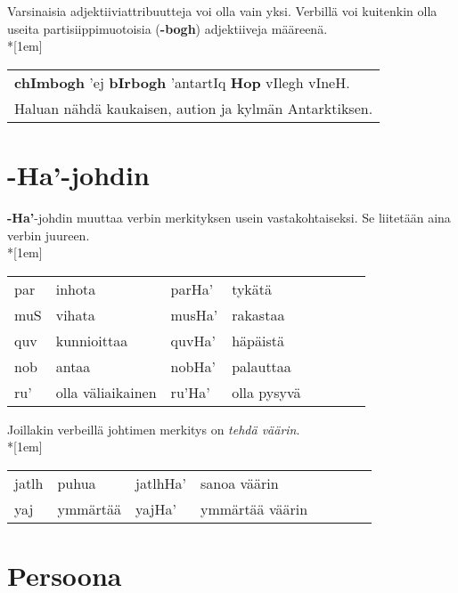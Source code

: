 \documentclass{book}
\begin{document}
Varsinaisia adjektiiviattribuutteja voi olla vain yksi. Verbillä voi kuitenkin olla useita partisiippimuotoisia (\textbf{-bogh}) adjektiiveja määreenä.\\*[1em]
\begin{tabular}{l}
    \textbf{chImbogh} 'ej \textbf{bIrbogh} 'antartIq \textbf{Hop} vIlegh vIneH. \\
    Haluan nähdä kaukaisen, aution ja kylmän Antarktiksen. \\
\end{tabular}

\section{-Ha'-johdin}

\textbf{-Ha'}-johdin muuttaa verbin merkityksen usein vastakohtaiseksi.
Se liitetään aina verbin juureen.\\*[1em]
\begin{tabular}{Bl Il | Bl Il}
    par & inhota & parHa' & tykätä \\
    muS & vihata & musHa' & rakastaa \\
    quv & kunnioittaa & quvHa' & häpäistä \\
    nob & antaa & nobHa' & palauttaa \\
    ru' & olla väliaikainen & ru'Ha' & olla pysyvä \\
\end{tabular}

Joillakin verbeillä johtimen merkitys on \textit{tehdä väärin}.\\*[1em]
\begin{tabular}{Bl Il | Bl Il}
    jatlh & puhua & jatlhHa' & sanoa väärin \\
    yaj & ymmärtää & yajHa' & ymmärtää väärin \\
\end{tabular}

\section{Persoona}
\end{document}
